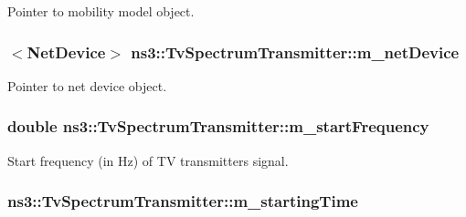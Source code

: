 Pointer to mobility model object. 

\subsubsection[{\texorpdfstring{m\+\_\+net\+Device}{m_netDevice}}]{$<${\bf Net\+Device}$>$ ns3\+::\+Tv\+Spectrum\+Transmitter\+::m\+\_\+net\+Device\hspace{0.3cm}{\ttfamily [private]}}\hypertarget{classns3_1_1TvSpectrumTransmitter_a48c928bdb3e53299d6e1cd35c2d2f7f5}{}\label{classns3_1_1TvSpectrumTransmitter_a48c928bdb3e53299d6e1cd35c2d2f7f5}


Pointer to net device object. 

\subsubsection[{\texorpdfstring{m\+\_\+start\+Frequency}{m_startFrequency}}]{\setlength{\rightskip}{0pt plus 5cm}double ns3\+::\+Tv\+Spectrum\+Transmitter\+::m\+\_\+start\+Frequency\hspace{0.3cm}{\ttfamily [private]}}\hypertarget{classns3_1_1TvSpectrumTransmitter_a776e1f1e5c91d1d4a457e26b0fc29375}{}\label{classns3_1_1TvSpectrumTransmitter_a776e1f1e5c91d1d4a457e26b0fc29375}


Start frequency (in Hz) of TV transmitter\textquotesingle{}s signal. 

\subsubsection[{\texorpdfstring{m\+\_\+starting\+Time}{m_startingTime}}]{ ns3\+::\+Tv\+Spectrum\+Transmitter\+::m\+\_\+starting\+Time\hspace{0.3cm}{\ttfamily [private]}}\hypertarget{classns3_1_1TvSpectrumTransmitter_a792038cd396efdc81c8f6ee2d54a0fd2}{}\label{classns3_1_1TvSpectrumTransmitter_a792038cd396efdc81c8f6ee2d54a0fd2}



